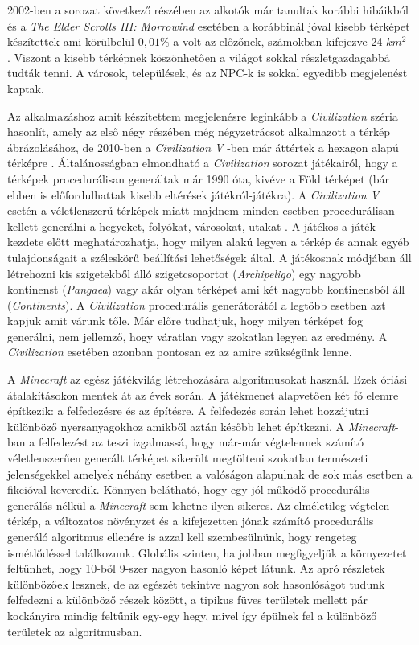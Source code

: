 2002-ben a sorozat következő részében az alkotók már tanultak korábbi hibáikból és a \textit{The Elder Scrolls III: Morrowind} esetében a korábbinál jóval kisebb térképet készítettek ami körülbelül $0,01 \%$-a volt az előzőnek, számokban kifejezve 24 $km^2$ \cite{Daggerfall}. Viszont a kisebb térképnek köszönhetően a világot sokkal részletgazdagabbá tudták tenni. A városok, települések, és az NPC-k is sokkal egyedibb megjelenést kaptak.

Az alkalmazáshoz amit készítettem megjelenésre leginkább a \textit{Civilization} széria hasonlít, amely az első négy részében még négyzetrácsot alkalmazott a térkép ábrázolásához, de 2010-ben a \textit{Civilization V} -ben már áttértek a hexagon alapú térképre \cite{Civ1}. Általánosságban elmondható a \textit{Civilization} sorozat játékairól, hogy a térképek procedurálisan generáltak már 1990 óta, kivéve a Föld térképet (bár ebben is előfordulhattak kisebb eltérések játékról-játékra). A \textit{Civilization V} esetén a véletlenszerű térképek miatt majdnem minden esetben procedurálisan kellett generálni a hegyeket, folyókat, városokat, utakat \cite{CivV}. A játékos a játék kezdete előtt meghatározhatja, hogy milyen alakú legyen a térkép és annak egyéb tulajdonságait a széleskörű beállítási lehetőségek által. A játékosnak módjában áll létrehozni kis szigetekből álló szigetcsoportot (\textit{Archipeligo}) egy nagyobb kontinenst (\textit{Pangaea}) vagy akár olyan térképet ami két nagyobb kontinensből áll (\textit{Continents}). A \textit{Civilization} procedurális generátorától a legtöbb esetben azt kapjuk amit várunk tőle. Már előre tudhatjuk, hogy milyen térképet fog generálni, nem jellemző, hogy váratlan vagy szokatlan legyen az eredmény. A \textit{Civilization} esetében azonban pontosan ez az amire szükségünk lenne.

A \textit{Minecraft} az egész játékvilág létrehozására algoritmusokat használ. Ezek óriási átalakításokon mentek át az évek során. A játékmenet alapvetően két fő elemre építkezik: a felfedezésre és az építésre. A felfedezés során lehet hozzájutni különböző nyersanyagokhoz amikből aztán később lehet építkezni. A \textit{Minecraft}-ban a felfedezést az teszi izgalmassá, hogy már-már végtelennek számító véletlenszerűen generált térképet sikerült megtölteni szokatlan természeti jelenségekkel amelyek néhány esetben a valóságon alapulnak de sok más esetben a fikcióval keveredik. Könnyen belátható, hogy egy jól működő procedurális generálás nélkül a \textit{Minecraft} sem lehetne ilyen sikeres. Az elméletileg végtelen térkép, a változatos növényzet és a kifejezetten jónak számító procedurális generáló algoritmus ellenére is azzal kell szembesülnünk, hogy rengeteg ismétlődéssel találkozunk. Globális szinten, ha jobban megfigyeljük a környezetet feltűnhet, hogy 10-ből 9-szer nagyon hasonló képet látunk. Az apró részletek különbözőek lesznek, de az egészét tekintve nagyon sok hasonlóságot tudunk felfedezni a különböző részek között, a tipikus füves területek mellett pár kockányira mindig feltűnik egy-egy hegy, mivel így épülnek fel a különböző területek az algoritmusban. 

